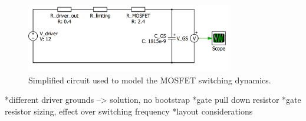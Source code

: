 \begin{figure}[htbp]
	\begin{center}
		\includegraphics[width=0.8\textwidth]{../Pictures/P1/Component_sizing/driver_resistor_sizing.png}
		\caption{Simplified circuit used to model the MOSFET switching dynamics.}
		\label{mosfet_rc_gate}
	\end{center}	
\end{figure}

*different driver grounds --> solution, no bootstrap
*gate pull down resistor
*gate resistor sizing, effect over switching frequency 
*layout considerations


